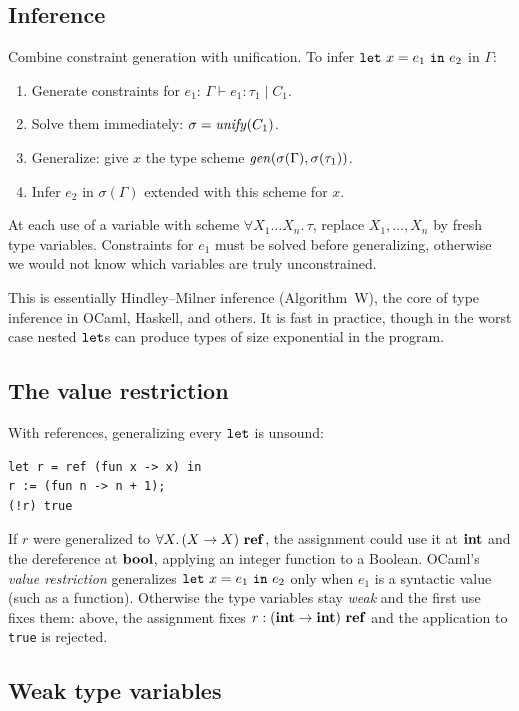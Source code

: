 \subsection{Inference}

Combine constraint generation with unification. To infer $\mathtt{let}\ x = e_1\
\mathtt{in}\ e_2$ in $\Gamma$:
\begin{enumerate}
  \item Generate constraints for $e_1$: $\Gamma \vdash e_1 : \tau_1 \mid C_1$.
  \item Solve them immediately: $\sigma = \mathit{unify}(C_1)$.
  \item Generalize: give $x$ the type scheme $\mathit{gen}(\sigma(\Gamma), \sigma(\tau_1))$.
  \item Infer $e_2$ in $\sigma(\Gamma)$ extended with this scheme for $x$.
\end{enumerate}
At each use of a variable with scheme $\forall X_1 \ldots X_n.\, \tau$, replace
$X_1, \ldots, X_n$ by fresh type variables. Constraints for $e_1$ must be solved
before generalizing, otherwise we would not know which variables are truly
unconstrained.

This is essentially Hindley--Milner inference (Algorithm~W), the core of type
inference in OCaml, Haskell, and others. It is fast in practice, though in the worst
case nested $\mathtt{let}$s can produce types of size exponential in the program.

\subsection{The value restriction}

With references, generalizing every $\mathtt{let}$ is unsound:
\begin{verbatim}
let r = ref (fun x -> x) in
r := (fun n -> n + 1);
(!r) true
\end{verbatim}
If $r$ were generalized to $\forall X.\, (X \to X)\ \kw{ref}$, the assignment could
use it at $\mathbf{int}$ and the dereference at $\mathbf{bool}$, applying an integer function
to a Boolean. OCaml's \emph{value restriction} generalizes
$\mathtt{let}\ x = e_1\ \mathtt{in}\ e_2$ only when $e_1$ is a syntactic value (such as a
function). Otherwise the type variables stay \emph{weak} and the first use fixes
them: above, the assignment fixes $r : (\kw{int} \to \kw{int})\ \kw{ref}$ and the
application to \texttt{true} is rejected.

\subsection{Weak type variables}

